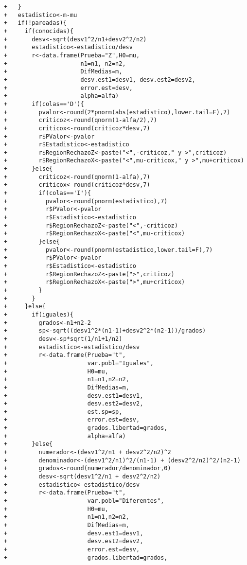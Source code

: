 \begin{solucion}
\begin{verbatim}
+   }
+   estadistico<-m-mu
+   if(!pareadas){
+     if(conocidas){
+       desv<-sqrt(desv1^2/n1+desv2^2/n2)
+       estadistico<-estadistico/desv
+       r<-data.frame(Prueba="Z",H0=mu,
+                     n1=n1, n2=n2,
+                     DifMedias=m,
+                     desv.est1=desv1, desv.est2=desv2,
+                     error.est=desv,
+                     alpha=alfa)
+       if(colas=='D'){
+         pvalor<-round(2*pnorm(abs(estadistico),lower.tail=F),7)
+         criticoz<-round(qnorm(1-alfa/2),7)
+         criticox<-round(criticoz*desv,7)
+         r$PValor<-pvalor
+         r$Estadistico<-estadistico
+         r$RegionRechazoZ<-paste("<",-criticoz," y >",criticoz)
+         r$RegionRechazoX<-paste("<",mu-criticox," y >",mu+criticox)
+       }else{
+         criticoz<-round(qnorm(1-alfa),7)
+         criticox<-round(criticoz*desv,7)
+         if(colas=='I'){
+           pvalor<-round(pnorm(estadistico),7)
+           r$PValor<-pvalor
+           r$Estadistico<-estadistico
+           r$RegionRechazoZ<-paste("<",-criticoz)
+           r$RegionRechazoX<-paste("<",mu-criticox)
+         }else{
+           pvalor<-round(pnorm(estadistico,lower.tail=F),7)
+           r$PValor<-pvalor
+           r$Estadistico<-estadistico
+           r$RegionRechazoZ<-paste(">",criticoz)
+           r$RegionRechazoX<-paste(">",mu+criticox)
+         }
+       }
+     }else{
+       if(iguales){
+         grados<-n1+n2-2
+         sp<-sqrt((desv1^2*(n1-1)+desv2^2*(n2-1))/grados)
+         desv<-sp*sqrt(1/n1+1/n2)
+         estadistico<-estadistico/desv
+         r<-data.frame(Prueba="t",
+                       var.pobl="Iguales",
+                       H0=mu,
+                       n1=n1,n2=n2,
+                       DifMedias=m,
+                       desv.est1=desv1,
+                       desv.est2=desv2,
+                       est.sp=sp,
+                       error.est=desv,
+                       grados.libertad=grados,
+                       alpha=alfa)
+       }else{
+         numerador<-(desv1^2/n1 + desv2^2/n2)^2
+         denominador<-(desv1^2/n1)^2/(n1-1) + (desv2^2/n2)^2/(n2-1)
+         grados<-round(numerador/denominador,0)
+         desv<-sqrt(desv1^2/n1 + desv2^2/n2)
+         estadistico<-estadistico/desv
+         r<-data.frame(Prueba="t",
+                       var.pobl="Diferentes",
+                       H0=mu,
+                       n1=n1,n2=n2,
+                       DifMedias=m,
+                       desv.est1=desv1,
+                       desv.est2=desv2,
+                       error.est=desv,
+                       grados.libertad=grados,

\end{verbatim}
\end{solucion}
